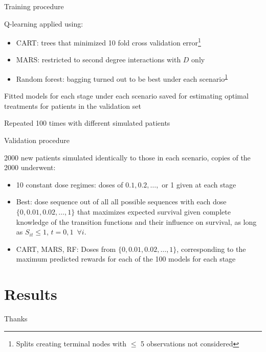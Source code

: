 \documentclass[handout]{beamer}
\begin{document}

\begin{frame}[c]{Training procedure}
  
  Q-learning applied using:
  \begin{itemize}
    \item CART: trees that minimized 10 fold cross validation error\footnote{\label{tree} Splits creating terminal nodes with $\leq$ 5 observations not considered}
    \item MARS: restricted to second degree interactions with $D$ only
    \item Random forest: bagging turned out to be best under each scenario\textsuperscript{\ref{tree}}
  \end{itemize}
  
  Fitted models for each stage under each scenario saved for estimating optimal treatments for patients in the validation set
  
  Repeated 100 times with different simulated patients
\end{frame}

\begin{frame}[t]{Validation procedure}
  
  2000 new patients simulated identically to those in each scenario, copies of the 2000 underwent:
  \begin{itemize}
    \item 10 constant dose regimes: doses of $0.1, 0.2, \ldots,$ or 1 given at each stage
    \item Best: dose sequence out of all all possible sequences with each dose $\{0, 0.01, 0.02, \ldots, 1\}$ that maximizes expected survival given complete knowledge of the transition functions and their influence on survival, as long as $S_{it} \leq 1$, $t = 0, 1 \enspace \forall i$.
    \item CART, MARS, RF: Doses from $\{0, 0.01, 0.02, \ldots, 1\}$, corresponding to the maximum predicted rewards for each of the 100 models for each stage
  \end{itemize}
\end{frame}

\section{Results} %
\label{sec:results}


\begin{frame}[standout]
  Thanks
\end{frame}
\end{document}
